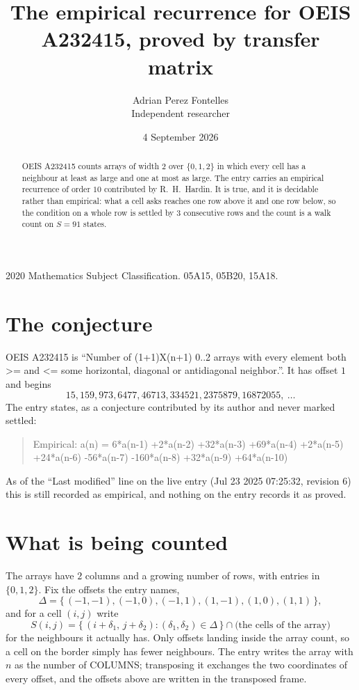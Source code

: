 \documentclass[11pt,a4paper]{article}
\title{The empirical recurrence for OEIS A232415, proved by transfer matrix}
\author{Adrian Perez Fontelles\\ \small Independent researcher}
\date{4 September 2026}
\theoremstyle{plain}
\theoremstyle{definition}
\begin{document}
\maketitle

\begin{abstract}
OEIS A232415 counts arrays of width $2$ over $\{0,1,2\}$ in which every cell has a neighbour at least as large and one at most as large. The entry carries an
empirical recurrence of order $10$ contributed by R.~H.~Hardin. It is true, and it is
decidable rather than empirical: what a cell asks reaches one row above it and one row below, so the
condition on a whole row is settled by $3$ consecutive rows and the count is a walk
count on $S=91$ states.
\end{abstract}

\noindent\small 2020 Mathematics Subject Classification. 05A15, 05B20, 15A18.\normalsize

\section{The conjecture}

OEIS A232415 is ``Number of (1+1)X(n+1) 0..2 arrays with every element both >= and <= some horizontal, diagonal or antidiagonal neighbor.''. It has offset $1$ and begins
\[
15, 159, 973, 6477, 46713, 334521, 2375879, 16872055,\ \dots
\]
The entry states, as a conjecture contributed by its author and never marked settled:
\begin{quote}
Empirical: a(n) = 6*a(n-1) +2*a(n-2) +32*a(n-3) +69*a(n-4) +2*a(n-5) +24*a(n-6) -56*a(n-7) -160*a(n-8) +32*a(n-9) +64*a(n-10)
\end{quote}
As of the ``Last modified'' line on the live entry (Jul 23 2025 07:25:32, revision 6) this is still
recorded as empirical, and nothing on the entry records it as proved.

\section{What is being counted}

The arrays have $2$ columns and a growing number of rows, with entries in $\{0,1,2\}$. Fix the
offsets the entry names,
\[
\Delta=\{\,(-1,-1), (-1,0), (-1,1), (1,-1), (1,0), (1,1)\,\},
\]
and for a cell $(i,j)$ write
\[
S(i,j)=\{\,(i+\delta_1,\,j+\delta_2) : (\delta_1,\delta_2)\in\Delta\,\}\cap
\text{(the cells of the array)}
\]
for the neighbours it actually has. Only offsets landing inside the array count, so a cell on
the border simply has fewer neighbours. The entry writes the array with $n$ as the number of COLUMNS; transposing it exchanges the two coordinates of every offset, and the offsets above are written in the transposed frame.
\end{document}
